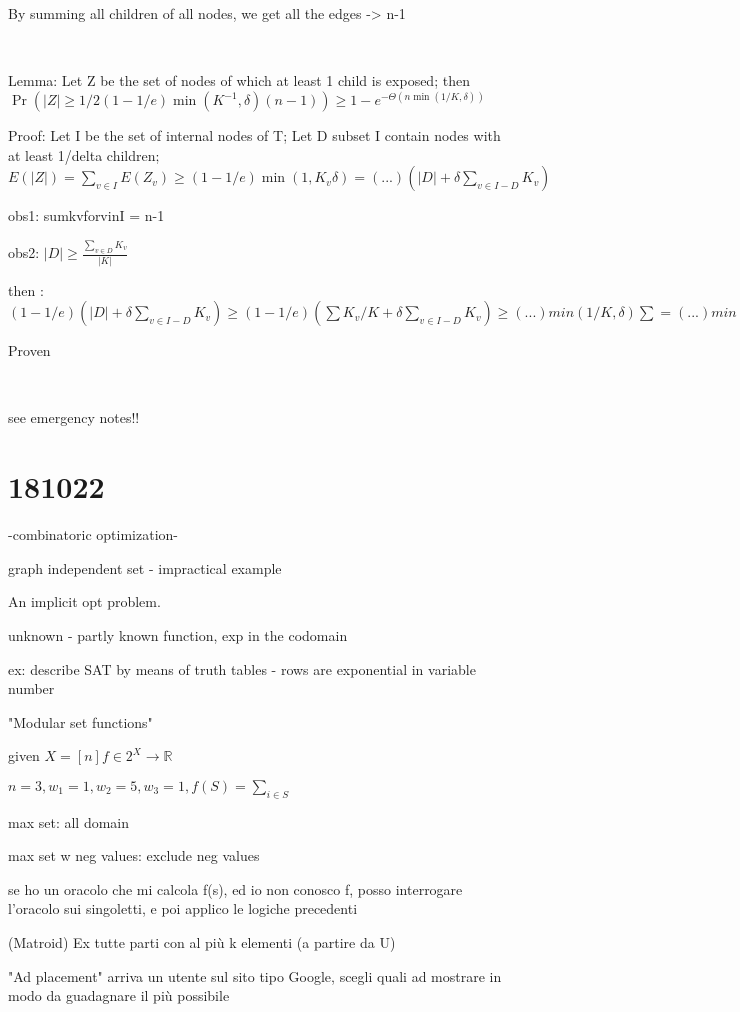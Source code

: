 \documentclass{report}
\begin{document}
	By summing all children of all nodes, we get all the edges -> n-1
	
	\
	
	Lemma: Let Z be the set of nodes of which at least 1 child is exposed; then $\Pr(|Z| \geq 1/2(1-1/e)\min(K^{-1}, \delta)(n-1))\geq 1-e^{-\Theta(n\min(1/K, \delta))}$
	
	Proof: Let I be the set of internal nodes of T; Let D subset I contain nodes with at least 1/delta children; $E(|Z|) = \sum_{v \in I}E(Z_v) \geq (1 - 1/e)\min(1, K_v\delta) = (...)(|D| + \delta\sum_{v \in I-D}K_v)$

	obs1: sumkvforvinI = n-1
	
	obs2: $|D| \geq \frac{\sum_{v \in D}K_v}{|K|}$
	
	then : $(1 - 1/e)(|D| + \delta\sum_{v \in I-D}K_v) \geq (1 - 1/e)(\sum K_v/K + \delta\sum_{v \in I-D}K_v) \geq (...)min(1/K, \delta)\sum = (...)min(...)(n-1)$
	
	Proven
	
	\
	
	see emergency notes!!
	
	\section{181022}
	
	-combinatoric optimization-
	
	graph independent set - impractical example
	
	An implicit opt problem.
	
	unknown - partly known function, exp in the codomain
	
	ex: describe SAT by means of truth tables - rows are exponential in variable number
	
	"Modular set functions"
	
	given $X=[n] f \in 2^X \to \mathbb{R}$
	
	$n=3, w_1 = 1, w_2 = 5, w_3 = 1, f(S)=\sum_{i \in S}$
	
	max  set: all domain
	
	max set w neg values: exclude neg values
	
	se ho un oracolo che mi calcola f(s), ed io non conosco f, posso interrogare l'oracolo sui singoletti, e poi applico le logiche precedenti
	
	(Matroid) Ex tutte parti con al più k elementi (a partire da U)
	
	"Ad placement"
	arriva un utente sul sito tipo Google, scegli quali ad mostrare in modo da guadagnare il più possibile
	
\end{document}
